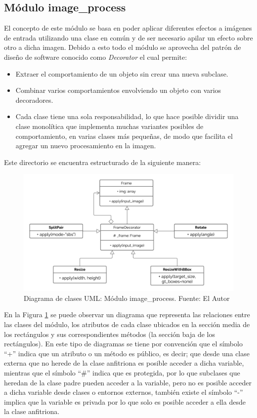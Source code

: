 \subsection{Módulo image\_process}
El concepto de este módulo se basa en poder aplicar diferentes efectos a imágenes de entrada utilizando una clase en común y de ser necesario apilar un efecto sobre otro a dicha imagen. Debido a esto todo el módulo se aprovecha del patrón de diseño de software conocido como \textit{Decorator} el cual permite:
\begin{itemize}
    \item Extraer el comportamiento de un objeto sin crear una nueva subclase.
    \item Combinar varios comportamientos envolviendo un objeto con varios decoradores.
    \item Cada clase tiene una sola responsabilidad, lo que hace posible dividir una clase monolítica que implementa muchas variantes posibles de comportamiento, en varias clases más pequeñas, de modo que facilita el agregar un nuevo procesamiento en la imagen.
\end{itemize}
Este directorio se encuentra estructurado de la siguiente manera:
\begin{figure}[H]
    \centering
    \includegraphics[scale=0.4]{Recursos/image_process_uml.png}
    \caption[Diagrama de clases UML: Módulo image\_process.]{Diagrama de clases UML: Módulo image\_process. {\footnotesize Fuente: El Autor}}
    \label{image_process_uml}
\end{figure}
En la Figura \ref{image_process_uml} se puede observar un diagrama que representa las relaciones entre las clases del módulo, los atributos de cada clase ubicados en la sección media de los rectángulos y sus correspondientes métodos (la sección baja de los rectángulos). En este tipo de diagramas se tiene por convención que el símbolo ``+'' indica que un atributo o un método es público, es decir; que desde una clase externa que no herede de la clase anfitriona es posible acceder a dicha variable, mientras que el símbolo ``\#'' indica que es protegida, por lo que subclases que heredan de la clase padre pueden acceder a la variable, pero no es posible acceder a dicha variable desde clases o entornos externos, también existe el símbolo ``-'' implica que la variable es privada por lo que solo es posible acceder a ella desde la clase anfitriona.
